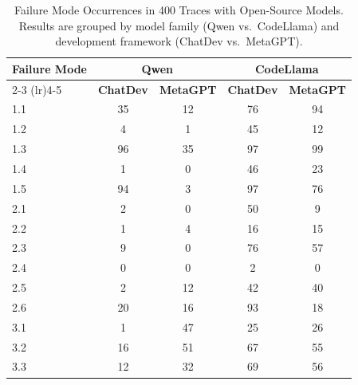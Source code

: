 \begin{table}[ht!]
    \small
    \renewcommand{\arraystretch}{1.3}
    \setlength{\tabcolsep}{4pt}
    \centering
    \caption{Failure Mode Occurrences in 400 Traces with Open-Source Models. Results are grouped by model family (Qwen vs.\ CodeLlama) and development framework (ChatDev vs.\ MetaGPT).}
    \label{tab:failure-modes-open-source}
    \begin{tabular}{p{2.5cm} c c c c}
        \toprule
        \textbf{Failure Mode} & \multicolumn{2}{c}{\textbf{Qwen}} & \multicolumn{2}{c}{\textbf{CodeLlama}} \\
        \cmidrule(lr){2-3} \cmidrule(lr){4-5}
         & \textbf{ChatDev} & \textbf{MetaGPT} & \textbf{ChatDev} & \textbf{MetaGPT} \\
        \midrule
        1.1 & 35 & 12 & 76 & 94 \\
        \hline
        1.2 & 4 & 1 & 45 & 12 \\
        \hline
        1.3 & 96 & 35 & 97 & 99 \\
        \hline
        1.4 & 1 & 0 & 46 & 23 \\
        \hline
        1.5 & 94 & 3 & 97 & 76 \\
        \hline
        2.1 & 2 & 0 & 50 & 9 \\
        \hline
        2.2 & 1 & 4 & 16 & 15 \\
        \hline
        2.3 & 9 & 0 & 76 & 57 \\
        \hline
        2.4 & 0 & 0 & 2 & 0 \\
        \hline
        2.5 & 2 & 12 & 42 & 40 \\
        \hline
        2.6 & 20 & 16 & 93 & 18 \\
        \hline
        3.1 & 1 & 47 & 25 & 26 \\
        \hline
        3.2 & 16 & 51 & 67 & 55 \\
        \hline
        3.3 & 12 & 32 & 69 & 56 \\
        \hline
    \end{tabular}
\label{tab:open_source_models}
\end{table}
